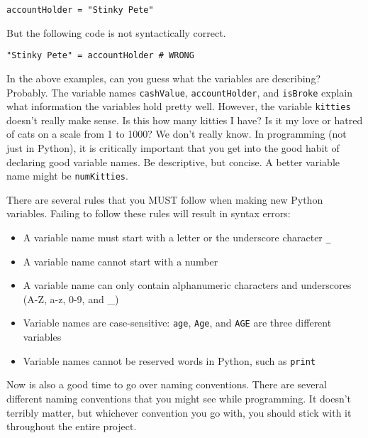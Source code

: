 \begin{lstlisting}[style=pippython]
accountHolder = "Stinky Pete"
\end{lstlisting}
But the following code is not syntactically correct.
\begin{lstlisting}[style=pippython]
"Stinky Pete" = accountHolder # WRONG
\end{lstlisting}
In the above examples, can you guess what the variables are describing? Probably. The variable names \verb|cashValue|, \verb|accountHolder|, and \verb|isBroke| explain what information the variables hold pretty well. However, the variable \verb|kitties| doesn't really make sense. Is this how many kitties I have? Is it my love or hatred of cats on a scale from 1 to 1000? We don't really know. In programming (not just in Python), it is critically important that you get into the good habit of declaring good variable names. Be descriptive, but concise. A better variable name might be \verb|numKitties|.\par
There are several rules that you MUST follow when making new Python variables. Failing to follow these rules will result in syntax errors:
\begin{itemize}
    \item A variable name must start with a letter or the underscore character \verb|_|
    \item A variable name cannot start with a number
    \item A variable name can only contain alphanumeric characters and underscores (A-Z, a-z, 0-9, and \_)
    \item Variable names are case-sensitive: \verb|age|, \verb|Age|, and \verb|AGE| are three different variables
    \item Variable names cannot be reserved words in Python, such as \verb|print|
\end{itemize}
Now is also a good time to go over naming conventions. There are several different naming conventions that you might see while programming. It doesn't terribly matter, but whichever convention you go with, you should stick with it throughout the entire project.\par

